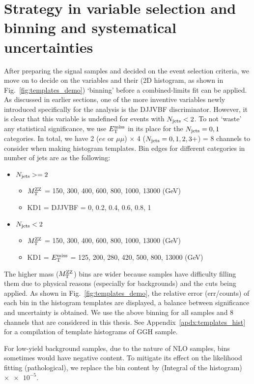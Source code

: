 \section{Strategy in variable selection and binning and systematical uncertainties}
After preparing the signal samples and decided on the event selection criteria, we move on to
decide on the variables and their (2D histogram, as shown in Fig.~\ref{fig:templates_demo}) `binning' before a combined-limits
fit can be applied. As discussed in earlier sections, one of the more inventive variables
newly introduced specifically for the analysis is the DJJVBF discriminator. However, it is
clear that this variable is undefined for events with $N_\mathrm{jets} < 2$. To
not `waste' any statistical significance, we use $E_{\mathrm{T}}^{\mathrm{miss}}$ in its place for the
$N_\mathrm{jets} = 0,1$ categories. In total, we have 2 ($ee$ or $\mu\mu$) $\times$ 4 ($N_\mathrm{jets} = 0,1,2,3+$) = 8
channels to consider when making histogram templates.
Bin edges for different categories in number of jets are as the following:
\begin{itemize} 
    \item $N_\mathrm{jets} >= 2$
        \begin{itemize} 
            \item $M_\mathrm{T}^{\mathrm{ZZ}}$ = 150, 300, 400, 600, 800, 1000, 13000 (GeV)
            \item KD1 = DJJVBF = 0, 0.2, 0.4, 0.6, 0.8, 1
        \end{itemize}
    \item $N_\mathrm{jets} < 2$
        \begin{itemize} 
            \item $M_\mathrm{T}^{\mathrm{ZZ}}$ = 150, 300, 400, 600, 800, 1000, 13000 (GeV)
            \item KD1 = $E_{\mathrm{T}}^{\mathrm{miss}}$ = 125, 200, 280, 420, 500, 800, 13000 (GeV)
        \end{itemize}
\end{itemize}
The higher mass ($M_\mathrm{T}^{\mathrm{ZZ}}$) bins are wider because samples
have difficulty filling them due to physical reasons (especially for backgrounds) 
and the cuts being applied. As shown in Fig.~\ref{fig:templates_demo}, the relative error (err/counts) of each
bin in the histogram templates are displayed, a balance between significance and uncertainty is
obtained. We use the above binning for all samples and 8 channels that are considered in this
thesis. See Appendix~\ref{apdx:templates_hist} for a compilation of template histograms of GGH sample.

For low-yield background samples, due to the nature of NLO samples, bins sometimes would have negative
content. To mitigate its effect on the likelihood fitting (pathological), we replace the bin content
by (Integral of the histogram) $\times \num{e-5}$.

